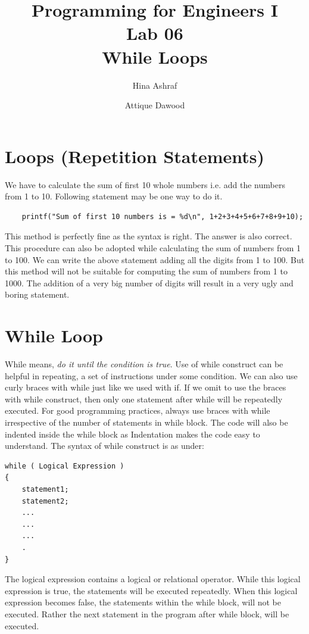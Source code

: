 \documentclass{article}
\title{Programming for Engineers I\\Lab 06\\While Loops}
\author{Hina Ashraf\and Attique Dawood}
\begin{document}
\maketitle

\section{Loops (Repetition Statements)}
We have to calculate the sum of first 10 whole numbers i.e. add the numbers from 1 to 10. Following statement may be one way to do it.
\begin{verbatim}
    printf("Sum of first 10 numbers is = %d\n", 1+2+3+4+5+6+7+8+9+10);
\end{verbatim}
This method is perfectly fine as the syntax is right. The answer is also correct. This procedure can also be adopted while calculating the sum of numbers from 1 to 100. We can write the above statement adding all the digits from 1 to 100. But this method will not be suitable for computing the sum of numbers from 1 to 1000. The addition of a very big number of digits will result in a very ugly and boring statement. 

\section{While Loop}
While means, \emph{do it until the condition is true}. Use of while construct can be helpful in repeating, a set of instructions under some condition. We can also use curly braces with while just like we used with if. If we omit to use the braces with while construct, then only one statement after while will be repeatedly executed. For good programming practices, always use braces with while irrespective of the number of statements in while block. The code will also be indented inside the while block as Indentation makes the code easy to understand. 
The syntax of while construct is as under:
\begin{verbatim}
while ( Logical Expression )
{
    statement1;
    statement2;
    ...
    ...
    ...
    .
}
\end{verbatim}
The logical expression contains a logical or relational operator. While this logical expression is true, the statements will be executed repeatedly. When this logical expression becomes false, the statements within the while block, will not be executed. Rather the next statement in the program after while block, will be executed. 
\end{document}
